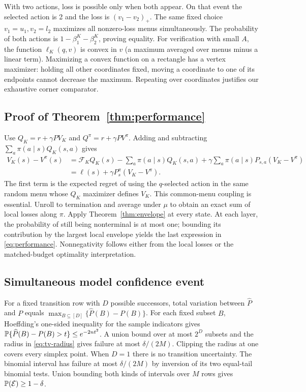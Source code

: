 \documentclass[11pt]{article}
\newcommand{\cF}{\mathcal F}\newcommand{\cC}{\mathcal C}
\begin{document}
With two actions, loss is possible only when both appear. On that event the selected action is 2 and the loss is $(v_1-v_2)_+$. The same fixed choice $v_1=u_1,v_2=l_2$ maximizes all nonzero-loss menus simultaneously. The probability of both actions is $1-\beta_1^K-\beta_2^K$, proving equality. For verification with small $A$, the function $\ell_K(q,v)$ is convex in $v$ (a maximum averaged over menus minus a linear term). Maximizing a convex function on a rectangle has a vertex maximizer: holding all other coordinates fixed, moving a coordinate to one of its endpoints cannot decrease the maximum. Repeating over coordinates justifies our exhaustive corner comparator.

\subsection{Proof of Theorem~\ref{thm:performance}}
Use $Q_K=r+\gamma PV_K$ and $Q^\pi=r+\gamma PV^\pi$. Adding and subtracting $\sum_a\pi(a\mid s)Q_K(s,a)$ gives
\begin{align*}
 V_K(s)-V^\pi(s)
 &=\cF_KQ_K(s)-\sum_a\pi(a\mid s)Q_K(s,a)
   +\gamma\sum_a\pi(a\mid s)P_{s,a}(V_K-V^\pi)\\
 &=\ell(s)+\gamma P^\pi_s(V_K-V^\pi).
\end{align*}
The first term is the expected regret of using the $q$-selected action in the same random menu whose $Q_K$ maximizer defines $V_K$. This common-menu coupling is essential. Unroll to termination and average under $\mu$ to obtain an exact sum of local losses along $\pi$. Apply Theorem~\ref{thm:envelope} at every state. At each layer, the probability of still being nonterminal is at most one; bounding its contribution by the largest local envelope yields the last expression in \eqref{eq:performance}. Nonnegativity follows either from the local losses or the matched-budget optimality interpretation.

\subsection{Simultaneous model confidence event}
For a fixed transition row with $D$ possible successors, total variation between $\widehat P$ and $P$ equals
$\max_{B\subseteq[D]}\{\widehat P(B)-P(B)\}$.
For each fixed subset $B$, Hoeffding's one-sided inequality for the sample indicators gives
$\mathbb P\{\widehat P(B)-P(B)>t\}\le e^{-2nt^2}$.
A union bound over at most $2^D$ subsets and the radius in \eqref{eq:tv-radius} gives failure at most $\delta/(2M)$. Clipping the radius at one covers every simplex point. When $D=1$ there is no transition uncertainty. The binomial interval has failure at most $\delta/(2M)$ by inversion of its two equal-tail binomial tests. Union bounding both kinds of intervals over $M$ rows gives $\mathbb P(\mathcal E)\ge1-\delta$.
\end{document}
